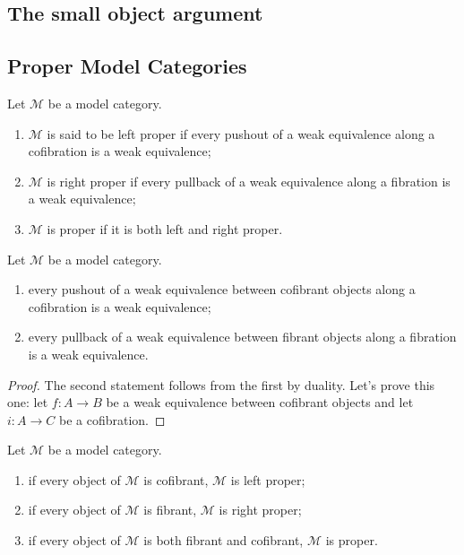 \subsection{The small object argument}

\subsection{Proper Model Categories}

\begin{defin}
Let $\mathcal M$ be a model category.
\begin{enumerate}
\item $\mathcal M$ is said to be left proper if every pushout of  a weak equivalence along a cofibration is a weak equivalence;
\item $\mathcal M$ is right proper if every pullback of a weak equivalence along a fibration is a weak equivalence;
\item $\mathcal M$ is proper if it is both left and right proper.
\end{enumerate}
\end{defin}

\begin{prop}
Let $\mathcal M$ be a model category.
\begin{enumerate}
\item every pushout of a weak equivalence between cofibrant objects along a cofibration is a weak equivalence;
\item every pullback of a weak equivalence between fibrant objects along a fibration is a weak equivalence.
\end{enumerate}
\end{prop}

\begin{proof}
The second statement follows from the first by duality. Let's prove this one: let $f \colon A \to B$ be a weak equivalence between cofibrant objects and let $i \colon A \to C$ be a cofibration.
\end{proof}

\begin{cor}
Let $\mathcal M$ be a model category.
\begin{enumerate}
\item if every object of $\mathcal M$ is cofibrant, $\mathcal M$ is left proper;
\item if every object of $\mathcal M$ is fibrant, $\mathcal M$ is right proper;
\item if every object of $\mathcal M$ is both fibrant and cofibrant, $\mathcal M$ is proper.
\end{enumerate}
\end{cor}

